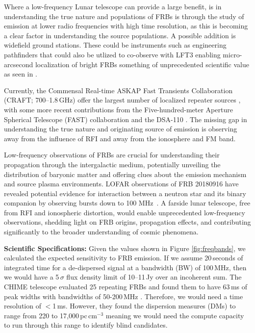 Where a low-frequency Lunar telescope can provide a large benefit, is in understanding the true nature and populations of FRBs is through the study of emission at lower radio frequencies with high time resolution, as this is becoming a clear factor in understanding the source populations. A possible addition is widefield ground stations. These could be instruments such as engineering pathfinders that could also be utlized to co-observe with LFT3 enabling micro-arcsecond localization of bright FRBs something of unprecedented scientific value as seen in \cite{nimmo_burst_2023}. 

Currently, the Commensal Real-time ASKAP Fast Transients Collaboration (CRAFT; 700--1.8\,GHz) offer the largest number of localized repeater sources \citep{shannon2024ics, SD_2023}, with some more recent contributions from the Five-hundred-meter Aperture Spherical Telescope (FAST) collaboration \citep[1.00--1.45\,GHz;][]{ZX_2023} and the DSA-110 \citep{LC_2023,sharma2024preferential}. The missing gap in understanding the true nature and originating source of emission is observing away from the influence of RFI and away from the ionosphere and FM band.

Low-frequency observations of FRBs are crucial for understanding their propagation through the intergalactic medium, potentially unveiling the distribution of baryonic matter and offering clues about the emission mechanism and source plasma environments. LOFAR observations of FRB 20180916 have revealed potential evidence for interaction between a neutron star and its binary companion by observing bursts down to 100 MHz~\citep{pleunis2021lofar}. A farside lunar telescope, free from RFI and ionospheric distortion, would enable unprecedented low-frequency observations, shedding light on FRB origins, propagation effects, and contributing significantly to the broader understanding of cosmic phenomena.

\textbf{Scientific Specifications:} Given the values shown in Figure \ref{fig:freqbands}, we calculated the expected sensitivity to FRB emission. If we assume 20\,seconds of integrated time for a de-dispersed signal at a bandwidth (BW) of 100\,MHz, then we would have a 5\,$\sigma$ flux density limit of 10--11\,Jy over an incoherent sum. The CHIME telescope evaluated 25 repeating FRBs and found them to have 63\,ms of peak widths with bandwidths of 50-200\,MHz \citep{CHIME_RepeatingFRB}. Therefore, we would need a time resolution of $<$1\,ms. However, they found the dispersion measures (DMs) to range from 220 to 17,000\,pc\,cm$^{-3}$ meaning we would need the compute capacity to run through this range to identify blind candidates. 

